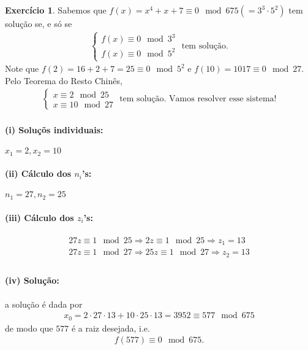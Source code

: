 \documentclass[a4paper,12pt]{article}
\theoremstyle{definition}
\newtheorem{exercise}{Exercício}%
\begin{document}
	\begin{exercise}
		Sabemos que $f(x) = x^4 + x + 7\equiv 0\mod 675 (= 3^3\cdot 5^2)$ tem solução se, e só se
		\begin{align*}
		\begin{cases}
		f(x) \equiv 0\mod 3^3 \\
		f(x) \equiv 0\mod 5^2
		\end{cases} \text{ tem solução.}
		\end{align*}
		Note que $f(2) = 16 + 2 + 7 = 25 \equiv 0\mod 5^2$ e $f(10) = 1017\equiv 0\mod 27$. Pelo Teorema do Resto Chinês, 
		\begin{align*}
		\begin{cases}
		x\equiv 2\mod 25 \\
		x\equiv 10\mod 27
		\end{cases}\text{ tem solução. Vamos resolver esse sistema!}
		\end{align*}
		\paragraph{(i) Soluçõs individuais:} $x_1 = 2, x_2 = 10$
		\paragraph{(ii) Cálculo dos $n_i$'s:} $n_1 = 27, n_2 = 25$
		\paragraph{(iii) Cálculo dos $z_i$'s:} 
		\begin{align*}
		27z\equiv 1\mod 25 \Rightarrow 2z\equiv 1\mod 25 \Rightarrow z_1 = 13 \\
		27z\equiv 1\mod 27 \Rightarrow 25z\equiv 1\mod 27 \Rightarrow z_2 = 13 \\
		\end{align*}
		\paragraph{(iv) Solução:} a solução é dada por
		\begin{align*}
		x_0 = 2\cdot 27\cdot 13 + 10\cdot 25\cdot 13 = 3952 \equiv 577\mod 675
		\end{align*}
		de modo que $577$ é a raiz desejada, i.e.
		\begin{align*}
		f(577)\equiv 0\mod 675.
		\end{align*}
	\end{exercise}
\end{document}
